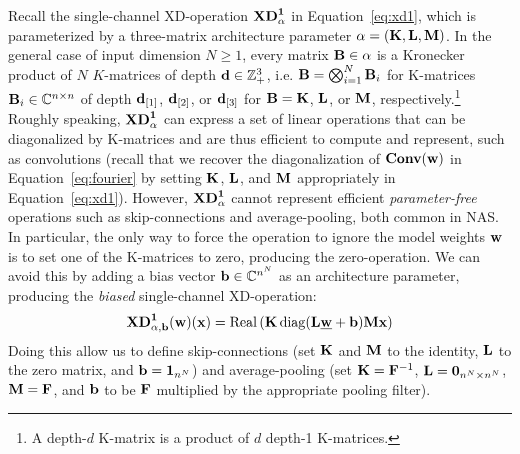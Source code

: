 Recall the single-channel XD-operation $\mathbf{XD}_\alpha^\mathbf 1$ in Equation~\ref{eq:xd1}, which is parameterized by a three-matrix architecture parameter $\alpha=(\mathbf{K},\mathbf{L},\mathbf{M})$.
In the general case of input dimension $N\ge1$, every matrix $\mathbf{B}\in\alpha$ is a Kronecker product of $N$ $K$-matrices of depth $\mathbf{d}\in\mathbb Z_+^3$, i.e. $\mathbf{B}=\bigotimes_{i=1}^N\mathbf{B}_i$ for K-matrices $\mathbf{B}_i\in\mathbb C^{n\times n}$ of depth $\mathbf{d}_{[1]}$, $\mathbf{d}_{[2]}$, or $\mathbf{d}_{[3]}$ for $\mathbf{B}=\mathbf{K}$, $\mathbf{L}$, or $\mathbf{M}$, respectively.\footnote{A depth-$d$ K-matrix is a product of $d$ depth-1 K-matrices.}
Roughly speaking, $\mathbf{XD}_\alpha^\mathbf 1$ can express a set of linear operations that can be diagonalized by K-matrices and are thus efficient to compute and represent, such as convolutions (recall that we recover the diagonalization of $\operatorname{\operatorname{\bf Conv}}(\mathbf{w})$ in Equation~\ref{eq:fourier} by setting $\mathbf{K}$, $\mathbf{L}$, and $\mathbf{M}$ appropriately in Equation~\ref{eq:xd1}).
However, $\mathbf{XD}_\alpha^\mathbf 1$ cannot represent efficient {\em parameter-free} operations such as skip-connections and average-pooling, both common in NAS.
In particular, the only way to force the operation to ignore the model weights $\mathbf{w}$ is to set one of the K-matrices to zero, producing the zero-operation.
We can avoid this by adding a bias vector $\mathbf{b}\in\mathbb C^{n^N}$ as an architecture parameter, producing the {\em biased} single-channel XD-operation:
\begin{equation}\label{eq:biased}
\mathbf{XD}_{\alpha,\mathbf{b}}^\mathbf 1(\mathbf{w})(\mathbf{x})=\operatorname{\operatorname{Real}}\left(\mathbf{K}\operatorname{\operatorname{diag}}(\mathbf{L}\underline{\mathbf{w}}+\mathbf{b})\mathbf{M}\mathbf{x}\right)
\end{equation}
Doing this allow us to define skip-connections (set $\mathbf{K}$ and $\mathbf{M}$ to the identity, $\mathbf{L}$ to the zero matrix, and $\mathbf{b}=\mathbf 1_{n^N}$) and average-pooling (set $\mathbf{K}=\mathbf{F}^{-1}$, $\mathbf{L}=\mathbf 0_{n^N\times n^N}$, $\mathbf{M}=\mathbf{F}$, and $\mathbf{b}$ to be $\mathbf{F}$ multiplied by the appropriate pooling filter).

